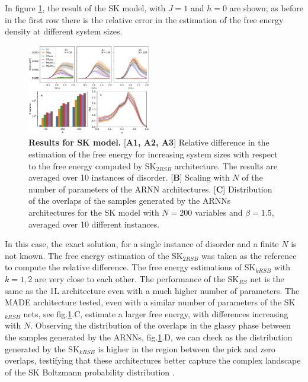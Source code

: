 \documentclass[aps,physrev,10pt,floatfix,reprint]{revtex4-2}
\begin{document}
In figure \ref{fig:SK}, the result of the SK model, with $J=1$ and $h=0$ are shown; as before in the first row there is the relative error in the estimation of the free energy density at different system sizes. 
\begin{figure}[h]
    \centering 
    \includegraphics[width=0.48\textwidth]{img/SK_res.pdf}
    \caption{\textbf{Results for SK model.} [\textbf{A1, A2, A3}] Relative difference in the estimation of the free energy for increasing system sizes with respect to the free energy computed by SK$_{2RSB}$ architecture. The results are averaged over 10 instances of disorder. [\textbf{B}] Scaling with $N$ of the number of parameters of the ARNN architectures. [\textbf{C}] Distribution of the overlaps of the samples generated by the ARNNs architectures for the SK model with $N=200$ variables and $\beta=1.5$, averaged over 10 different instances.}
    \label{fig:SK}
\end{figure}
In this case, the exact solution, for a single instance of disorder and a finite $N$ is not known. The free energy estimation of the SK$_{2RSB}$ was taken as the reference to compute the relative difference. The free energy estimations of SK$_{kRSB}$ with $k=1,2$ are very close to each other.
The performance of the SK$_{RS}$ net is the same as the 1L architecture even with a much higher number of parameters. The MADE architecture tested, even with a similar number of parameters of the SK$_{kRSB}$ nets, see fig.\ref{fig:SK}.C, estimate a larger free energy, with differences increasing with $N$. Observing the distribution of the overlaps in the glassy phase between the samples generated by the ARNNs, fig.\ref{fig:SK}.D, we can check as the distribution generated by the SK$_{kRSB}$ is higher in the region between the pick and zero overlaps, testifying that these architectures better capture the complex landscape of the SK Boltzmann probability distribution \cite{PhysRevLett.51.1206}.
\end{document}
